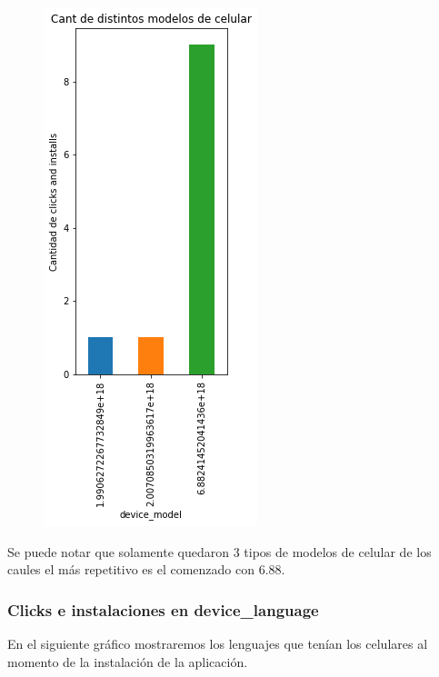 \documentclass[a4paper, 12pt]{article}
\begin{document}
{{	
		\begin{figure}[H]
			\centering
			\includegraphics[scale = 0.5]{images/clicks-installs/device_model.png}
			\caption{}
		\end{figure}
	

	Se puede notar que solamente quedaron 3 tipos de modelos de celular de los caules el más repetitivo es el comenzado con 6.88.
	
	\subsubsection{Clicks e instalaciones en device\_language}
	En el siguiente gráfico mostraremos los lenguajes que tenían los celulares al momento de la instalación de la aplicación.
	
}}
\end{document}
